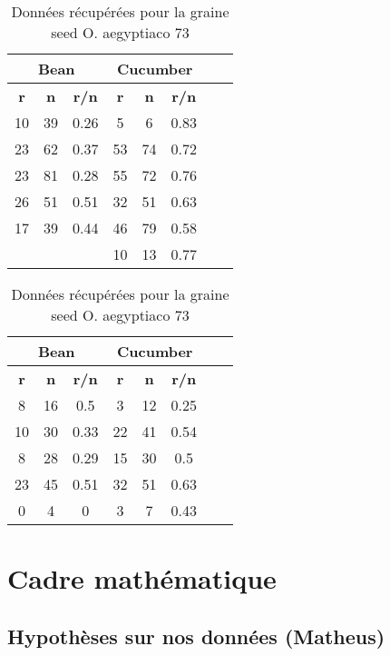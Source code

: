 \documentclass[
]{article}
\begin{document}
\begin{table}[h]
\centering
\small
\begin{minipage}{0.45\textwidth}
\centering
\begin{tabular}{|c|c|c|c|c|c|c|c|}
\hline
\multicolumn{3}{|c|}{\textbf{Bean}} & \multicolumn{3}{|c|}{\textbf{Cucumber}} \\
\hline
\textbf{r} & \textbf{n} & \textbf{r/n} & \textbf{r} & \textbf{n} & \textbf{r/n} \\
\hline
10 & 39 & 0.26 & 5 & 6 & 0.83 \\
23 & 62 & 0.37 & 53 & 74 & 0.72 \\
23 & 81 & 0.28 & 55 & 72 & 0.76 \\
26 & 51 & 0.51 & 32 & 51 & 0.63 \\
17 & 39 & 0.44 & 46 & 79 & 0.58 \\
 & & & 10 & 13 & 0.77 \\
\hline
\end{tabular}
\caption{Données récupérées pour la graine seed O. aegyptiaco 75}
\label{tab:tableau1}
\end{minipage}\hfill
\begin{minipage}{0.45\textwidth}
\centering
\begin{tabular}{|c|c|c|c|c|c|c|c|}
\hline
\multicolumn{3}{|c|}{\textbf{Bean}} & \multicolumn{3}{|c|}{\textbf{Cucumber}} \\
\hline
\textbf{r} & \textbf{n} & \textbf{r/n} & \textbf{r} & \textbf{n} & \textbf{r/n} \\
\hline
8 & 16 & 0.5 & 3 & 12 & 0.25 \\
10 & 30 & 0.33 & 22 & 41 & 0.54 \\
8 & 28 & 0.29 & 15 & 30 & 0.5 \\
23 & 45 & 0.51 & 32 & 51 & 0.63 \\
0 & 4 & 0 & 3 & 7 & 0.43 \\
\hline
\end{tabular}
\caption{Données récupérées pour la graine seed O. aegyptiaco 73}
\label{tab:tableau2}
\end{minipage}
\end{table}

\hypertarget{cadre-mathuxe9matique}{%
\section{Cadre mathématique}\label{cadre-mathuxe9matique}}

\hypertarget{hypothuxe8ses-sur-nos-donnuxe9es-matheus}{%
\subsection{Hypothèses sur nos données
(Matheus)}\label{hypothuxe8ses-sur-nos-donnuxe9es-matheus}}
\end{document}
